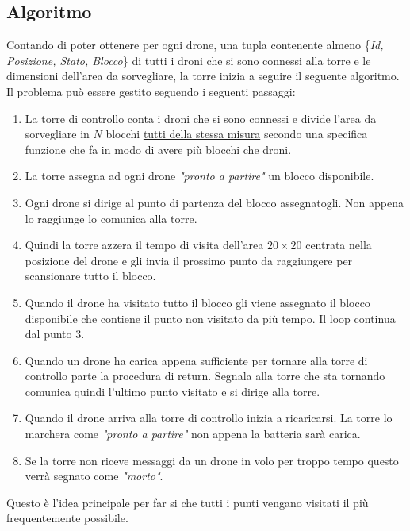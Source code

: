 \documentclass[a4paper, 11pt]{article}
\begin{document}
\subsection{Algoritmo}
Contando di poter ottenere per ogni drone, una tupla contenente almeno \{\textit{Id, Posizione, Stato, Blocco}\} di tutti i droni che si sono connessi alla torre e le dimensioni dell'area da sorvegliare, la torre inizia a seguire il seguente algoritmo.
Il problema può essere gestito seguendo i seguenti passaggi:
\begin{enumerate}
    
    \item La torre di controllo conta i droni che si sono connessi e divide l'area da sorvegliare in $N$ blocchi \underline{tutti della stessa misura}
     secondo una specifica funzione che fa in modo di avere più blocchi che droni.

    \item La torre assegna ad ogni drone \textit{"pronto a partire"} un blocco disponibile.

    \item Ogni drone si dirige al punto di partenza del blocco assegnatogli. Non appena lo raggiunge lo comunica alla torre.

    \item Quindi la torre azzera il tempo di visita dell'area $20\times 20$ centrata nella posizione del drone e gli invia il prossimo punto da raggiungere
     per scansionare tutto il blocco.

    \item Quando il drone ha visitato tutto il blocco gli viene assegnato il blocco disponibile che contiene il punto non visitato da più tempo. Il loop continua dal punto 3.
    \item Quando un drone ha carica appena sufficiente per tornare alla torre di controllo parte la procedura di return. 
    Segnala alla torre che sta tornando comunica quindi l'ultimo punto visitato e si dirige alla torre.
    
    \item Quando il drone arriva alla torre di controllo inizia a ricaricarsi.
    La torre lo marchera come \textit{"pronto a partire"} non appena la batteria sarà carica.

    \item Se la torre non riceve messaggi da un drone in volo per troppo tempo questo verrà segnato come \textit{"morto"}. 
\end{enumerate}
Questo è l'idea principale per far si che tutti i punti vengano visitati il più frequentemente possibile.
\end{document}
